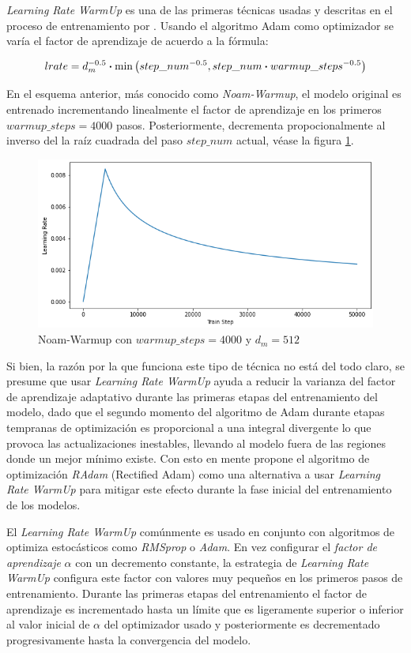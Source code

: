 \textit{Learning Rate WarmUp} es una de las primeras técnicas usadas y descritas en el proceso de
entrenamiento por \citeauthor{Vaswani}. Usando el algoritmo Adam como optimizador se varía el factor
de aprendizaje de acuerdo a la fórmula:

\begin{equation}
    lrate = d_{m}^{-0.5} \vdot \min\big(step\_num^{-0.5}, step\_num \vdot warmup\_steps^{-0.5} \big)
\end{equation}

En el esquema anterior, más conocido como \textit{Noam-Warmup}, el modelo original es entrenado
incrementando linealmente el factor de aprendizaje en los primeros $warmup\_steps=4000$ pasos.
Posteriormente, decrementa propocionalmente al inverso del la raíz cuadrada del paso $step\_num$
actual, véase la figura \ref{fig:noam}.

\begin{figure}[ht!]
    \centering
    \includegraphics[width=0.5 \textwidth]{Chapters/1. Transformer/Figures/transformer/noam.png}
    \caption{Noam-Warmup con $warmup\_steps=4000$ y $d_{m} = 512$}
    \label{fig:noam}
\end{figure}

Si bien, la razón por la que funciona este tipo de técnica no está del todo claro, se presume que usar
\textit{Learning Rate WarmUp} ayuda a reducir la varianza del factor de aprendizaje adaptativo durante
las primeras etapas del entrenamiento del modelo, dado que el segundo momento del algoritmo
de Adam durante etapas tempranas de optimización es proporcional a una integral divergente
\cite{DBLP:journals/corr/abs-1908-03265} lo que provoca las actualizaciones inestables, llevando al
modelo fuera de las regiones donde un mejor mínimo existe. Con esto en mente
\citeauthor{DBLP:journals/corr/abs-1908-03265} propone el algoritmo de optimización
\textit{RAdam} (Rectified Adam) como una alternativa a usar \textit{Learning Rate WarmUp} para mitigar
este efecto durante la fase inicial del entrenamiento de los modelos.

El \textit{Learning Rate WarmUp}
comúnmente es usado en conjunto con algoritmos de optimiza estocásticos como \textit{RMSprop} o
\textit{Adam}. En vez configurar el \textit{factor de aprendizaje} $\alpha$ con un decremento
constante, la estrategia de \textit{Learning Rate WarmUp} configura este factor con valores muy
pequeños en los primeros pasos de entrenamiento. Durante las primeras etapas del entrenamiento
el factor de aprendizaje es incrementado hasta un límite que es ligeramente superior o inferior al valor
inicial de $\alpha$ del optimizador usado y posteriormente es  decrementado
progresivamente hasta la convergencia del modelo.

